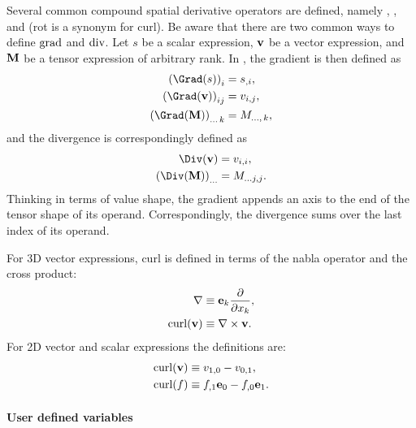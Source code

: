 Several common compound spatial derivative operators are defined,
namely , ,  and  (rot is
a synonym for curl). Be aware that there are two common ways to define
$\operatorname{grad}$ and $\operatorname{div}$. Let $s$ be a scalar expression, $\mathbf{v}$ be
a vector expression, and $\mathbf{M}$ be a tensor expression of arbitrary
rank.  In \ufl{}, the gradient is then defined as
\begin{align}
\left(\Grad (s) \right)_{i} &= s_{,i}, \\
\left(\Grad (\vv) \right)_{ij} &= v_{i,j}, \\
\left(\Grad (\MM) \right)_{\ldots \, k} &= M_{\ldots, \, k},
\end{align}
and the divergence is correspondingly defined as
\begin{align}
\Div (\vv) &= v_{i,i}, \\
\left(\Div (\MM) \right)_{\ldots} &= M_{\ldots j,j}.
\end{align}
Thinking in terms of value shape, the gradient appends an axis to the
end of the tensor shape of its operand.  Correspondingly, the
divergence sums over the last index of its operand.

For 3D vector expressions, curl is defined in terms
of the nabla operator and the cross product:
\begin{align}
  \nabla &\equiv \mathbf{e}_k \frac{\partial}{\partial x_k}, \\
  \operatorname{curl}(\mathbf{v}) &\equiv \nabla \times \mathbf{v}.
\end{align}
For 2D vector and scalar expressions the definitions are:
\begin{align}
  \operatorname{curl}(\mathbf{v}) &\equiv v_{1,0} - v_{0,1}, \\
  \operatorname{curl}(f)   &\equiv f_{,1}\mathbf{e}_0 - f_{,0}\mathbf{e}_1.
\end{align}

\paragraph{User defined variables}
\label{ufl:sec:diff}

